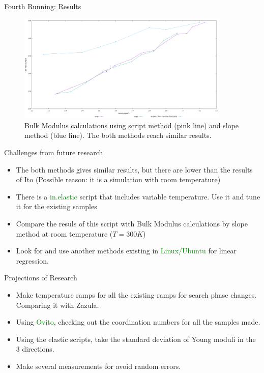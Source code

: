 \documentclass[11pt]{beamer}
\begin{document}
\begin{frame}{Fourth Running: Results}
\begin{figure}
 \centering
    \includegraphics[width=0.9\textwidth]{plot-yeah4.png}
 \caption{Bulk Modulus calculations using script method (pink line) and slope method (blue line). The both methods reach similar results.}
 \end{figure}
\end{frame}
\begin{frame}{Challenges from future research}
\begin{itemize}
    \item The both methods gives similar results, but there are lower than the results of Ito (Possible reason: it is a simulation with room temperature)
    \item There is a \textcolor{green}{in.elastic} script that includes variable temperature. Use it and tune it for the existing samples 
    \item Compare the resuls of this script with Bulk Modulus calculations by slope method at room temperature ($T=300K$)
    \item Look for and use another methods existing in \textcolor{green}{Linux/Ubuntu} for linear regression.
\end{itemize}
\end{frame}
\begin{frame}{Projections of Research}
\begin{itemize}
    \item Make temperature ramps for all the existing ramps for search phase changes. Comparing it with Zazula.
    \item Using \textcolor{green}{Ovito}, checking out the coordination numbers for all the samples made.
    \item Using the elastic scripts, take the standard deviation of Young moduli in the 3 directions.
    \item Make several measurements for avoid random errors.
\end{itemize}
\end{frame}
\end{document}
